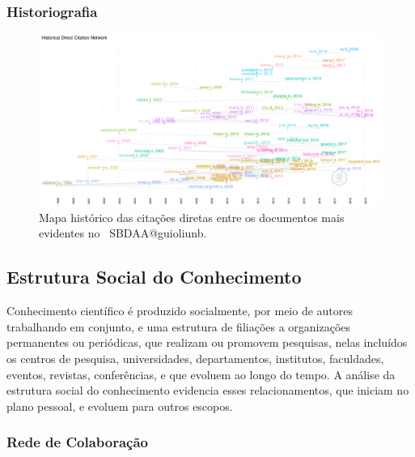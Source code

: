\subsubsection{Historiografia}

\begin{figure}
    \centering
    \includegraphics[width=1\textwidth]{experiments/jhcf/PesqBibliogr/SimulacaoMultiagente/WoS-20220203/Estrutura/Intelectual/MASSA2-HistoricalDirectCitationNetwork-100docs.png}
    \caption{Mapa histórico das citações diretas entre os documentos mais evidentes no  \dataset\ SBDAA@guioliunb.}
    \label{fig:MASSA2-HistoricalDirectCitationNetwork-100docs}
\end{figure}

\subsection{Estrutura Social  do Conhecimento}

Conhecimento científico é produzido socialmente, por meio de autores trabalhando em conjunto, e uma estrutura de filiações a organizações permanentes ou periódicas, que realizam ou promovem pesquisas, nelas incluídos os centros de pesquisa, universidades, departamentos, institutos, faculdades, eventos, revistas, conferências, e que evoluem ao longo do tempo. A análise da estrutura social do conhecimento evidencia esses relacionamentos, que iniciam no plano pessoal, e evoluem para outros escopos.

\subsubsection{Rede de Colaboração}

